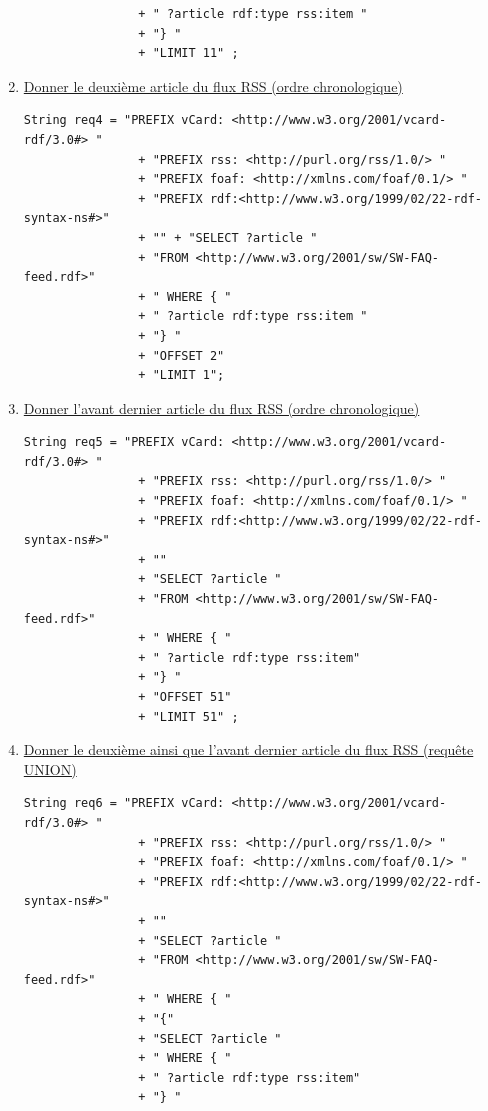 \documentclass[12pt,a4paper]{article}
\begin{document}
\begin{justify}
\begin{enumerate}
\begin{verbatim}
                + " ?article rdf:type rss:item "
                + "} "
                + "LIMIT 11" ;
            \end{verbatim}
            \item \underline{Donner le deuxième article du flux RSS (ordre chronologique)}
            \begin{verbatim}
String req4 = "PREFIX vCard: <http://www.w3.org/2001/vcard-rdf/3.0#> "
                + "PREFIX rss: <http://purl.org/rss/1.0/> "
                + "PREFIX foaf: <http://xmlns.com/foaf/0.1/> "
                + "PREFIX rdf:<http://www.w3.org/1999/02/22-rdf-syntax-ns#>"
                + "" + "SELECT ?article "
                + "FROM <http://www.w3.org/2001/sw/SW-FAQ-feed.rdf>"
                + " WHERE { "
                + " ?article rdf:type rss:item "
                + "} "
                + "OFFSET 2"
                + "LIMIT 1";
            \end{verbatim}
            \item \underline{Donner l’avant dernier article du flux RSS (ordre chronologique)}
            \begin{verbatim}
String req5 = "PREFIX vCard: <http://www.w3.org/2001/vcard-rdf/3.0#> "
                + "PREFIX rss: <http://purl.org/rss/1.0/> "
                + "PREFIX foaf: <http://xmlns.com/foaf/0.1/> "
                + "PREFIX rdf:<http://www.w3.org/1999/02/22-rdf-syntax-ns#>"
                + ""
                + "SELECT ?article "
                + "FROM <http://www.w3.org/2001/sw/SW-FAQ-feed.rdf>"
                + " WHERE { "
                + " ?article rdf:type rss:item"
                + "} "
                + "OFFSET 51"
                + "LIMIT 51" ;
            \end{verbatim}
            \item \underline{Donner le deuxième ainsi que l’avant dernier article du flux RSS (requête UNION)}
            \begin{verbatim}
String req6 = "PREFIX vCard: <http://www.w3.org/2001/vcard-rdf/3.0#> "
                + "PREFIX rss: <http://purl.org/rss/1.0/> "
                + "PREFIX foaf: <http://xmlns.com/foaf/0.1/> "
                + "PREFIX rdf:<http://www.w3.org/1999/02/22-rdf-syntax-ns#>"
                + ""
                + "SELECT ?article "
                + "FROM <http://www.w3.org/2001/sw/SW-FAQ-feed.rdf>"
                + " WHERE { "
                + "{"
                + "SELECT ?article "
                + " WHERE { "
                + " ?article rdf:type rss:item"
                + "} "

\end{verbatim}
\end{enumerate}
\end{justify}
\end{document}
